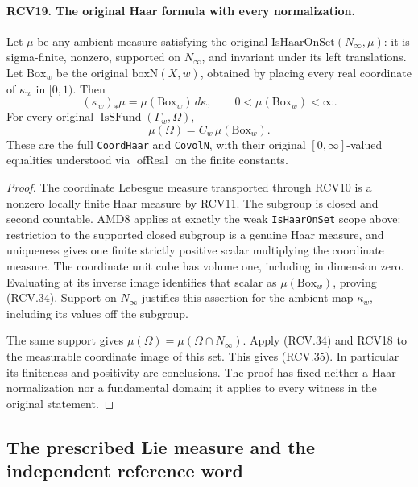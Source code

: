 \documentclass[11pt,a4paper]{article}
\numberwithin{equation}{section}
\theoremstyle{remark}\newtheorem{remark}[theorem]{Remark}
\begin{document}
\paragraph{RCV19. The original Haar formula with every normalization.}
\label{claim:RCV19}
Let \(\mu\) be any ambient measure satisfying the original
\(\mathrm{IsHaarOnSet}(N_\infty,\mu)\): it is sigma-finite,
nonzero, supported on \(N_\infty\), and invariant under its
left translations.  Let \(\mathrm{Box}_w\) be the original
\(\mathrm{boxN}(X,w)\), obtained by placing every real coordinate
of \(\kappa_w\) in \([0,1)\).  Then
\[
 (\kappa_w)_*\mu=\mu(\mathrm{Box}_w)\,d\kappa,
 \qquad 0<\mu(\mathrm{Box}_w)<\infty.
\tag{RCV.34}
\]
For every original \(\operatorname{IsSFund}(\Gamma_w,\Omega)\),
\[
                 \mu(\Omega)=C_w\,\mu(\mathrm{Box}_w).
\tag{RCV.35}
\]
These are the full \texttt{Coord\allowbreak Haar} and \texttt{Covol\allowbreak N},
with their original \([0,\infty]\)-valued equalities understood
via \(\operatorname{ofReal}\) on the finite constants.
\begin{proof}
The coordinate Lebesgue measure transported through RCV10 is a
nonzero locally finite Haar measure by RCV11.  The subgroup is
closed and second countable.  AMD8 applies at exactly the weak
\texttt{Is\allowbreak Haar\allowbreak On\allowbreak Set} scope above: restriction to the supported
closed subgroup is a genuine Haar measure, and uniqueness gives
one finite strictly positive scalar multiplying the coordinate
measure.  The coordinate unit cube has volume one, including
in dimension zero.  Evaluating at its inverse image identifies
that scalar as \(\mu(\mathrm{Box}_w)\), proving (RCV.34).
Support on \(N_\infty\) justifies this assertion for the ambient
map \(\kappa_w\), including its values off the subgroup.

The same support gives \(\mu(\Omega)=\mu(\Omega\cap N_\infty)\).
Apply (RCV.34) and RCV18 to the measurable coordinate image of
this set.  This gives (RCV.35).  In particular its finiteness and
positivity are conclusions.  The proof has fixed neither a Haar
normalization nor a fundamental domain; it applies to every
witness in the original statement.
\end{proof}

\subsection{The prescribed Lie measure and the independent reference word}

\end{document}
